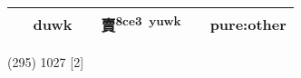 \documentclass[14pt,a4paper]{scrartcl}
\begin{document}
\begin{longtable}[c]{@{}llllll@{}}
\begin{minipage}[t]{0.14\columnwidth}\raggedright\strut
𧵽
\strut\end{minipage} &
\begin{minipage}[t]{0.14\columnwidth}\raggedright\strut
duwk
\strut\end{minipage} &
\begin{minipage}[t]{0.14\columnwidth}\raggedright\strut
\strut\end{minipage} &
\begin{minipage}[t]{0.14\columnwidth}\raggedright\strut
賣\textsuperscript{8ce3~yuwk}
\strut\end{minipage} &
\begin{minipage}[t]{0.14\columnwidth}\raggedright\strut
\strut\end{minipage} &
\begin{minipage}[t]{0.14\columnwidth}\raggedright\strut
pure:other
\strut\end{minipage}\tabularnewline
\bottomrule
\end{longtable}

(295) 1027 {[}2{]}
\end{document}
